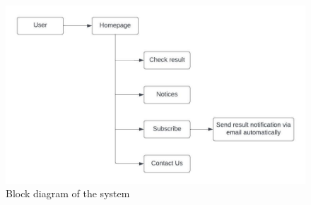 \begin{figure}[h]
\centering
    \includegraphics[scale=0.7]{images/block.jpg}
    \caption{Block diagram of the system}
    \label{fig:my_label}
\end{figure}

